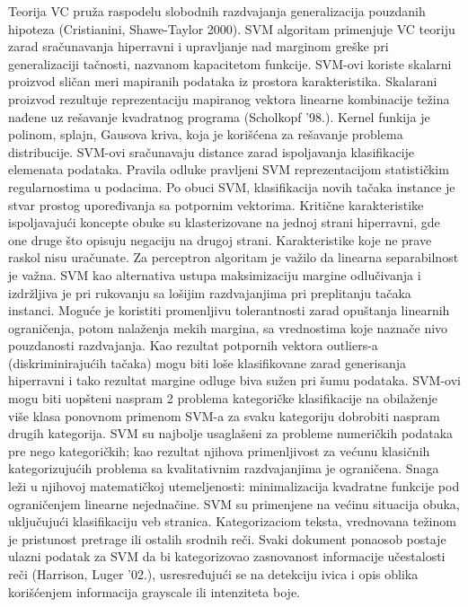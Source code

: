 \documentclass[fontsize=11bp, paper=a4]{scrarticle}
\begin{document}
Teorija VC pruža raspodelu slobodnih razdvajanja generalizacija pouzdanih hipoteza (Cristianini, Shawe-Taylor 2000). SVM algoritam primenjuje VC teoriju zarad sračunavanja hiperravni i upravljanje nad marginom greške pri generalizaciji tačnosti, nazvanom kapacitetom funkcije. SVM-ovi koriste skalarni proizvod sličan meri mapiranih podataka iz prostora karakteristika. Skalarani proizvod rezultuje reprezentaciju mapiranog vektora linearne kombinacije težina nađene uz rešavanje kvadratnog programa (Scholkopf '98.). Kernel funkija je polinom, splajn, Gausova kriva, koja je korišćena za rešavanje problema distribucije. SVM-ovi sračunavaju distance zarad ispoljavanja klasifikacije elemenata podataka. Pravila odluke pravljeni SVM reprezentacijom statističkim regularnostima u podacima. Po obuci SVM, klasifikacija novih tačaka instance je stvar prostog upoređivanja sa potpornim vektorima. Kritične karakteristike ispoljavajući koncepte obuke su klasterizovane na jednoj strani hiperravni, gde one druge što opisuju negaciju na drugoj strani. Karakteristike koje ne prave raskol nisu uračunate. Za perceptron algoritam je važilo da linearna separabilnost je važna. SVM kao alternativa ustupa maksimizaciju margine odlučivanja i izdržljiva je  pri rukovanju sa lošijim razdvajanjima pri preplitanju tačaka instanci. Moguće je koristiti promenljivu tolerantnosti zarad opuštanja linearnih ograničenja, potom nalaženja mekih margina, sa vrednostima koje naznače nivo pouzdanosti razdvajanja. Kao rezultat potpornih vektora outliers-a (diskriminirajućih tačaka)  mogu biti loše klasifikovane zarad generisanja hiperravni i tako rezultat margine odluge biva sužen pri šumu podataka. SVM-ovi mogu biti uopšteni naspram 2 problema kategoričke klasifikacije na obilaženje više klasa ponovnom primenom SVM-a za svaku kategoriju dobrobiti naspram drugih kategorija. SVM su najbolje usaglašeni za probleme numeričkih podataka pre nego kategoričkih; kao rezultat njihova primenljivost za većunu klasičnih kategorizujućih problema sa kvalitativnim razdvajanjima je ograničena. Snaga leži u njihovoj matematičkoj utemeljenosti: minimalizacija kvadratne funkcije pod ograničenjem linearne nejednačine. SVM su primenjene na većinu situacija obuka, uključujući klasifikaciju veb stranica. Kategorizaciom teksta, vrednovana težinom je pristunost pretrage ili ostalih srodnih reči. Svaki dokument ponaosob postaje ulazni podatak za SVM da bi kategorizovao zasnovanost informacije učestalosti reči (Harrison, Luger '02.), usresređujući se na detekciju ivica i opis oblika korišćenjem informacija grayscale ili intenziteta boje.
\end{document}
